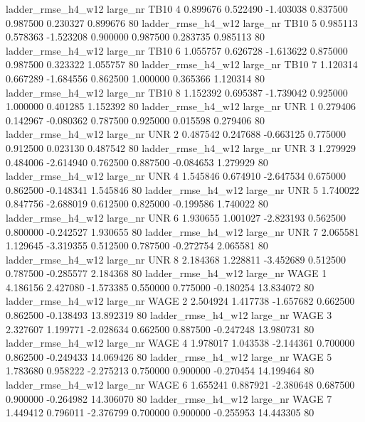  ladder_rmse_h4_w12   large_nr     TB10                 4  0.899676  0.522490  -1.403038 0.837500 0.987500  0.230327    0.899676 80
 ladder_rmse_h4_w12   large_nr     TB10                 5  0.985113  0.578363  -1.523208 0.900000 0.987500  0.283735    0.985113 80
 ladder_rmse_h4_w12   large_nr     TB10                 6  1.055757  0.626728  -1.613622 0.875000 0.987500  0.323322    1.055757 80
 ladder_rmse_h4_w12   large_nr     TB10                 7  1.120314  0.667289  -1.684556 0.862500 1.000000  0.365366    1.120314 80
 ladder_rmse_h4_w12   large_nr     TB10                 8  1.152392  0.695387  -1.739042 0.925000 1.000000  0.401285    1.152392 80
 ladder_rmse_h4_w12   large_nr      UNR                 1  0.279406  0.142967  -0.080362 0.787500 0.925000  0.015598    0.279406 80
 ladder_rmse_h4_w12   large_nr      UNR                 2  0.487542  0.247688  -0.663125 0.775000 0.912500  0.023130    0.487542 80
 ladder_rmse_h4_w12   large_nr      UNR                 3  1.279929  0.484006  -2.614940 0.762500 0.887500 -0.084653    1.279929 80
 ladder_rmse_h4_w12   large_nr      UNR                 4  1.545846  0.674910  -2.647534 0.675000 0.862500 -0.148341    1.545846 80
 ladder_rmse_h4_w12   large_nr      UNR                 5  1.740022  0.847756  -2.688019 0.612500 0.825000 -0.199586    1.740022 80
 ladder_rmse_h4_w12   large_nr      UNR                 6  1.930655  1.001027  -2.823193 0.562500 0.800000 -0.242527    1.930655 80
 ladder_rmse_h4_w12   large_nr      UNR                 7  2.065581  1.129645  -3.319355 0.512500 0.787500 -0.272754    2.065581 80
 ladder_rmse_h4_w12   large_nr      UNR                 8  2.184368  1.228811  -3.452689 0.512500 0.787500 -0.285577    2.184368 80
 ladder_rmse_h4_w12   large_nr     WAGE                 1  4.186156  2.427080  -1.573385 0.550000 0.775000 -0.180254   13.834072 80
 ladder_rmse_h4_w12   large_nr     WAGE                 2  2.504924  1.417738  -1.657682 0.662500 0.862500 -0.138493   13.892319 80
 ladder_rmse_h4_w12   large_nr     WAGE                 3  2.327607  1.199771  -2.028634 0.662500 0.887500 -0.247248   13.980731 80
 ladder_rmse_h4_w12   large_nr     WAGE                 4  1.978017  1.043538  -2.144361 0.700000 0.862500 -0.249433   14.069426 80
 ladder_rmse_h4_w12   large_nr     WAGE                 5  1.783680  0.958222  -2.275213 0.750000 0.900000 -0.270454   14.199464 80
 ladder_rmse_h4_w12   large_nr     WAGE                 6  1.655241  0.887921  -2.380648 0.687500 0.900000 -0.264982   14.306070 80
 ladder_rmse_h4_w12   large_nr     WAGE                 7  1.449412  0.796011  -2.376799 0.700000 0.900000 -0.255953   14.443305 80
